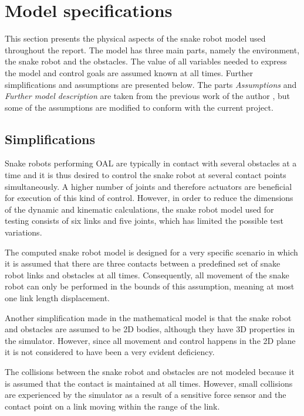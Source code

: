 \section{Model specifications} \label{ch:model_specs}

This section presents the physical aspects of the snake robot model used throughout the report. The model has three main parts, namely the environment, the snake robot and the obstacles. The value of all variables needed to express the model and control goals are assumed known at all times. Further simplifications and assumptions are presented below. The parts \textit{Assumptions} and \textit{Further model description} are taken from the previous work of the author \cite{AtussaProsjektoppgp}, but some of the assumptions are modified to conform with the current project.

\subsection{Simplifications}

Snake robots performing OAL are typically in contact with several obstacles at a time and it is thus desired to control the snake robot at several contact points simultaneously. A higher number of joints and therefore actuators are beneficial for execution of this kind of control. However, in order to reduce the dimensions of the dynamic and kinematic calculations, the snake robot model used for testing consists of six links and five joints, which has limited the possible test variations.

The computed snake robot model is designed for a very specific scenario in which it is assumed that there are three contacts between a predefined set of snake robot links and obstacles at all times. Consequently, all movement of the snake robot can only be performed in the bounds of this assumption, meaning at most one link length displacement.

Another simplification made in the mathematical model is that the snake robot and obstacles are assumed to be 2D bodies, although they have 3D properties in the simulator. However, since all movement and control happens in the 2D plane it is not considered to have been a very evident deficiency.

The collisions between the snake robot and obstacles are not modeled because it is assumed that the contact is maintained at all times. However, small collisions are experienced by the simulator as a result of a sensitive force sensor and the contact point on a link moving within the range of the link.


